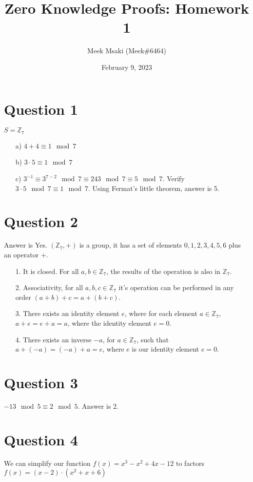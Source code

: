 \documentclass{article}
\title{Zero Knowledge Proofs: Homework 1}
\author{Meek Msaki (Meek\#6464)}
\date{February 9, 2023}
\begin{document}
\maketitle

\section*{Question 1}
$S=\mathbb{Z}_7$
\begin{itemize}
    \item[a)] $4+4 \equiv 1 \mod 7$
    \item[b)] $3\cdot5 \equiv 1 \mod 7$
    \item[c)] $3^{-1} \equiv 3^{7-2} \mod 7 \equiv 243 \mod 7 \equiv 5 \mod 7$. Verify $3\cdot5 \mod7 \equiv 1 \mod 7$. Using Fermat's little theorem, answer is 5.
\end{itemize}

\section*{Question 2}
Answer is Yes. $(\mathbb{Z}_7, +)$ is a group, it has a set of elements ${0,1,2,3,4,5,6}$ plus an operator $+$. 

\begin{itemize}
    \item[1.]It is closed. For all $a,b \in \mathbb Z_7$, the results of the operation is also in $\mathbb Z_7$.
    \item[2.]Associativity, for all $a,b,c \in \mathbb Z_7$ it's operation can be performed in any order $(a+b)+c=a+(b+c)$.
    \item[3.]There exists an identity element $e$, where for each element $a\in \mathbb{Z}_7$, $a+e=e+a=a$, where the identity element $e=0$.
    \item[4.]There exists an inverse $-a$, for $a \in \mathbb Z_7$, such that $a+(-a)=(-a)+a=e$, where $e$ is our identity element $e=0$.
\end{itemize} 

\section*{Question 3}
$-13 \mod 5 \equiv 2 \mod 5$. Answer is 2.

\section*{Question 4}

We can simplify our function $f(x) = x^{3}-x^{2}+4x-12$ to factors $f(x)= (x-2)\cdot (x^{2}+x+6)$
\end{document}
